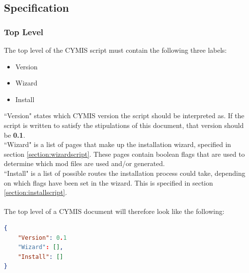 \documentclass{article}
\newcommand{\cymisversion}{0.1}
\begin{document}
\newpage

\subsection{Specification}\label{section:specification}
\subsubsection{Top Level}
The top level of the CYMIS script must contain the following three labels:
\begin{itemize}
\item Version
\item Wizard
\item Install
\end{itemize}
``Version" states which CYMIS version the script should be interpreted as. If the script is written to satisfy the stipulations of this document, that version should be \textbf{\cymisversion}.\\
``Wizard" is a list of pages that make up the installation wizard, specified in section \ref{section:wizardscript}. These pages contain boolean flags that are used to determine which mod files are used and/or generated.\\
``Install" is a list of possible routes the installation process could take, depending on which flags have been set in the wizard. This is specified in section \ref{section:installscript}.\\\\
The top level of a CYMIS document will therefore look like the following:
\begin{lstlisting}[language=json,firstnumber=1]
{
    "Version": 0.1
    "Wizard": [],
    "Install": []
}
\end{lstlisting}
\end{document}
